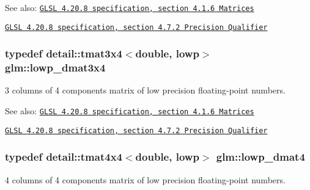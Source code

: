 \begin{Desc}
\item[See also:]\href{http://www.opengl.org/registry/doc/GLSLangSpec.4.20.8.pdf}{\tt GLSL 4.20.8 specification, section 4.1.6 Matrices} 

\href{http://www.opengl.org/registry/doc/GLSLangSpec.4.20.8.pdf}{\tt GLSL 4.20.8 specification, section 4.7.2 Precision Qualifier} \end{Desc}
\hypertarget{group__core__precision_g4640e1d20ad705842525e79a4cc57b15}{
\subsubsection[lowp\_\-dmat3x4]{\setlength{\rightskip}{0pt plus 5cm}typedef detail::tmat3x4$<$double, lowp$>$ {\bf glm::lowp\_\-dmat3x4}}}
\label{group__core__precision_g4640e1d20ad705842525e79a4cc57b15}


3 columns of 4 components matrix of low precision floating-point numbers.

\begin{Desc}
\item[See also:]\href{http://www.opengl.org/registry/doc/GLSLangSpec.4.20.8.pdf}{\tt GLSL 4.20.8 specification, section 4.1.6 Matrices} 

\href{http://www.opengl.org/registry/doc/GLSLangSpec.4.20.8.pdf}{\tt GLSL 4.20.8 specification, section 4.7.2 Precision Qualifier} \end{Desc}
\hypertarget{group__core__precision_gea69794db4e619881b77d37bf84b337e}{
\subsubsection[lowp\_\-dmat4]{\setlength{\rightskip}{0pt plus 5cm}typedef detail::tmat4x4$<$double, lowp$>$ {\bf glm::lowp\_\-dmat4}}}
\label{group__core__precision_gea69794db4e619881b77d37bf84b337e}


4 columns of 4 components matrix of low precision floating-point numbers.

